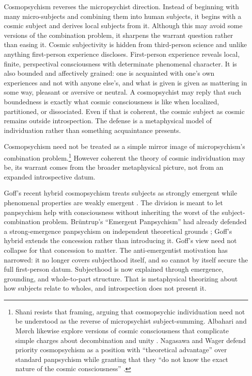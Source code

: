 Cosmopsychism reverses the micropsychist direction. Instead of beginning with many micro-subjects and combining them into human subjects, it begins with a cosmic subject and derives local subjects from it. Although this may avoid some versions of the combination problem, it sharpens the warrant question rather than easing it. Cosmic subjectivity is hidden from third-person science and unlike anything first-person experience discloses. First-person experience reveals local, finite, perspectival consciousness with determinate phenomenal character. It is also bounded and affectively grained: one is acquainted with one's own experiences and not with anyone else's, and what is given is given as mattering in some way, pleasant or aversive or neutral. A cosmopsychist may reply that such boundedness is exactly what cosmic consciousness is like when localized, partitioned, or dissociated. Even if that is coherent, the cosmic subject as cosmic remains outside introspection. The defense is a metaphysical model of individuation rather than something acquaintance presents.

Cosmopsychism need not be treated as a simple mirror image of micropsychism's combination problem.\footnote{Shani resists that framing, arguing that cosmopsychic individuation need not be understood as the reverse of micropsychist subject-summing. Albahari and M{\o}rch likewise explore versions of cosmic consciousness that complicate simple charges about decombination and unity \citep{shani2015,shani2022,albahari2019,morch2024allone}. Nagasawa and Wager defend priority cosmopsychism as a position with ``theoretical advantage'' over standard panpsychism while granting that they ``do not know the exact nature of the cosmic consciousness'' \citep[113,~120--121]{nagasawaWager2017}.} However coherent the theory of cosmic individuation may be, its warrant comes from the broader metaphysical picture, not from an expanded introspective datum.

Goff's recent hybrid cosmopsychism treats subjects as strongly emergent while phenomenal properties are weakly emergent \citep{goff2024}. The division is meant to let panpsychism help with consciousness without inheriting the worst of the subject-combination problem. Br{\"u}ntrup's ``Emergent Panpsychism'' had already defended a strong-emergence panpsychism on independent theoretical grounds \citep[68--69]{bruntrup2017emergent}; Goff's hybrid extends the concession rather than introducing it. Goff's view need not collapse for that concession to matter. The anti-emergentist motivation has narrowed: it no longer covers subjecthood itself, and so cannot by itself secure the full first-person datum. Subjecthood is now explained through emergence, grounding, and whole-to-part structure. That is metaphysical theorizing about how subjects relate to wholes, and introspection does not present it.

